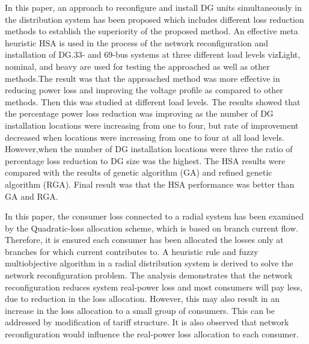 	\cite{rao} In this paper, an approach to reconfigure and install DG units simultaneously in the distribution system has been proposed which includes different loss reduction methods to establish the superiority of the proposed method. An effective meta heuristic HSA is used in the process of the network reconfiguration and installation of DG.33- and 69-bus systems at three different load levels vizLight, nominal, and heavy are used for testing the approached as well as other methods.The result was that the approached method was more effective in reducing power loss and improving the voltage profile as compared to other methods. Then this  was studied at different load levels. The results showed that the percentage power loss reduction was improving as the number of DG installation locations were increasing from one to four, but rate of improvement decreased when locations were increasing from one to four at all load levels. However,when the number of DG installation locations were three the ratio of percentage loss reduction to DG size was the highest. The HSA results were compared with the results of genetic algorithm (GA) and refined genetic algorithm (RGA). Final result was that the HSA performance was better than GA and RGA.
	
	\cite{69bus} In this paper, the consumer loss connected to a radial system has been examined by the Quadratic-loss allocation scheme, which is based on branch current flow. Therefore, it is ensured each consumer has been allocated the losses only at branches for which current contributes to.  A heuristic rule and fuzzy multiobjective algorithm in a radial distribution system is derived to solve the network reconfiguration problem. The analysis demonstrates that the network reconfiguration reduces system real-power loss and most consumers will pay less, due to reduction in the loss allocation. However, this may also result in an increase in the loss allocation to a small group of consumers. This can be addressed by modification of tariff structure. It is also observed that network reconfiguration would influence the real-power loss allocation to each consumer.
	
